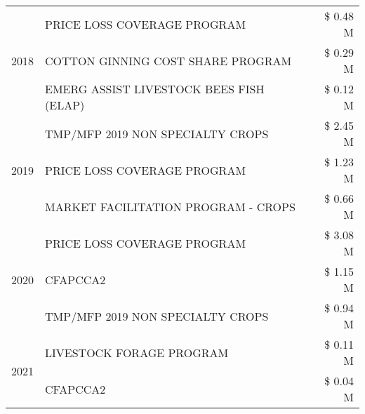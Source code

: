 \begin{tabular}{llr}
\cline{1-3}
\multirow[t]{3}{*}{2018} & PRICE LOSS COVERAGE PROGRAM & \$ 0.48 M \\
 & COTTON GINNING COST SHARE PROGRAM & \$ 0.29 M \\
 & EMERG ASSIST LIVESTOCK BEES FISH (ELAP) & \$ 0.12 M \\
\cline{1-3}
\multirow[t]{3}{*}{2019} & TMP/MFP 2019 NON SPECIALTY CROPS & \$ 2.45 M \\
 & PRICE LOSS COVERAGE PROGRAM & \$ 1.23 M \\
 & MARKET FACILITATION PROGRAM - CROPS & \$ 0.66 M \\
\cline{1-3}
\multirow[t]{3}{*}{2020} & PRICE LOSS COVERAGE PROGRAM & \$ 3.08 M \\
 & CFAPCCA2 & \$ 1.15 M \\
 & TMP/MFP 2019 NON SPECIALTY CROPS & \$ 0.94 M \\
\cline{1-3}
\multirow[t]{2}{*}{2021} & LIVESTOCK FORAGE PROGRAM & \$ 0.11 M \\
 & CFAPCCA2 & \$ 0.04 M \\
\cline{1-3}
\bottomrule
\end{tabular}
